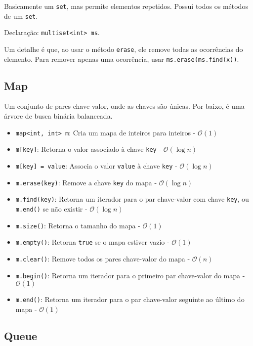 \documentclass[10pt, a4paper, oneside]{book}
\begin{document}
Basicamente um \texttt{set}, mas permite elementos repetidos. Possui todos os métodos de um \texttt{set}.

Declaração: \texttt{multiset<int> ms}.

Um detalhe é que, ao usar o método \texttt{erase}, ele remove todas as ocorrências do elemento. Para remover apenas uma ocorrência, usar \texttt{ms.erase(ms.find(x))}.

\subsection{Map}

Um conjunto de pares chave-valor, onde as chaves são únicas. Por baixo, é uma árvore de busca binária balanceada.

\begin{itemize}
    \item \texttt{map<int, int> m}: Cria um mapa de inteiros para inteiros - $\mathcal{O}(1)$
    \item \texttt{m[key]}: Retorna o valor associado à chave \texttt{key} - $\mathcal{O}(\log n)$
    \item \texttt{m[key] = value}: Associa o valor \texttt{value} à chave \texttt{key} - $\mathcal{O}(\log n)$
    \item \texttt{m.erase(key)}: Remove a chave \texttt{key} do mapa - $\mathcal{O}(\log n)$
    \item \texttt{m.find(key)}: Retorna um iterador para o par chave-valor com chave \texttt{key}, ou \texttt{m.end()} se não existir - $\mathcal{O}(\log n)$
    \item \texttt{m.size()}: Retorna o tamanho do mapa - $\mathcal{O}(1)$
    \item \texttt{m.empty()}: Retorna \texttt{true} se o mapa estiver vazio - $\mathcal{O}(1)$
    \item \texttt{m.clear()}: Remove todos os pares chave-valor do mapa - $\mathcal{O}(n)$
    \item \texttt{m.begin()}: Retorna um iterador para o primeiro par chave-valor do mapa - $\mathcal{O}(1)$
    \item \texttt{m.end()}: Retorna um iterador para o par chave-valor seguinte ao último do mapa - $\mathcal{O}(1)$
\end{itemize}

\subsection{Queue}
\end{document}
